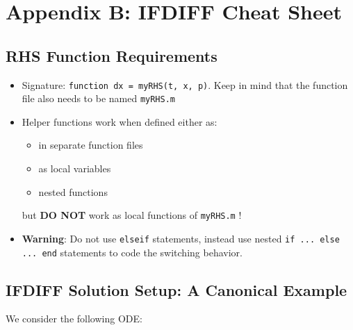 \section*{Appendix B: IFDIFF Cheat Sheet}
\subsection*{RHS Function Requirements}
\begin{itemize}
	\item Signature: \lstinline!function dx = myRHS(t, x, p)!. Keep in mind that the function file also needs to be named \lstinline!myRHS.m!
	\item Helper functions work when defined either as:
	\begin{itemize}
		\item in separate function files 
		\item as local variables
		\item nested functions
	\end{itemize} 
	but \textbf{DO NOT} work as local functions of \lstinline!myRHS.m! !
	\item \textbf{Warning}: Do not use \lstinline!elseif! statements, instead use nested \lstinline!if ... else ... end! statements to code the switching behavior. 
\end{itemize}


\subsection*{IFDIFF Solution Setup: A Canonical Example}
We consider the following ODE:

